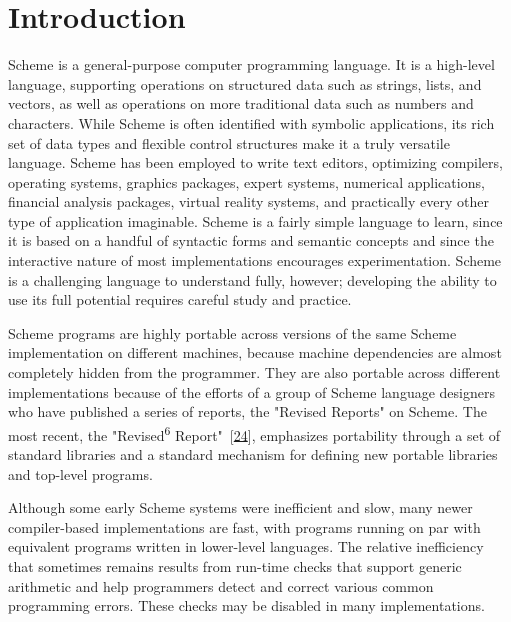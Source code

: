 \chapter{Introduction\label{intro_CHPTINTRO}}
\label{intro_g0}
\label{intro_h0}
\begin{figure}[H]
\centering
\setlength{\fboxrule}{3pt}
\end{figure}
\clearpage





Scheme is a general-purpose computer programming language.
It is a high-level language, supporting operations on structured
data such as strings, lists, and vectors, as well as operations on
more traditional data such as numbers and characters.
While Scheme is often identified with symbolic
applications, its rich set of data types and flexible
control structures make it a truly versatile language.
Scheme has been employed to write text editors, optimizing
compilers, operating systems, graphics packages, expert systems,
numerical applications, financial analysis packages,
virtual reality systems,
and practically every other type of application imaginable.
Scheme is a fairly simple language to learn, since it is based
on a handful of syntactic forms and semantic concepts and
since the interactive nature of most implementations encourages
experimentation.
Scheme is a challenging language to understand fully, however;
developing the ability to use its full potential requires careful study
and practice.


Scheme programs are highly portable across versions of
the same Scheme implementation on different machines, because machine
dependencies are almost completely hidden from the programmer.
They are also portable across different implementations because of the
efforts of a group of Scheme language designers who have published
a series of reports,
the "\label{intro_s0}Revised Reports" on Scheme.
The most recent, the 
"Revised\textsuperscript{6} Report" [\hyperref[bibliography_g242]{24}], emphasizes portability
through a set of standard libraries and a standard mechanism for
defining new portable libraries and top-level programs.


Although some early Scheme systems were inefficient and slow,
many newer compiler-based implementations are fast, with programs
running on par with equivalent programs written in
lower-level languages.
The relative inefficiency that sometimes remains results from run-time
checks that support generic arithmetic and help programmers
detect and correct various common
programming errors.
These checks may be disabled in many implementations.


